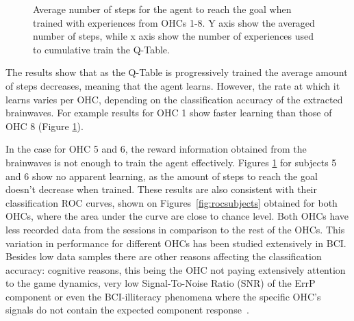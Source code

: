 \documentclass[journal]{IEEEtran}
\begin{document}
{{\begin{figure}[h!]
\begin{subfigure}{0.5\textwidth}
\end{subfigure}
\caption{Average number of steps for the agent to reach the goal when trained with experiences from OHCs 1-8. Y axis show the averaged number of steps, while x axis show the number of experiences used to cumulative train the Q-Table.}
\label{fig:avg_steps}
\end{figure}


The results show that as the Q-Table is progressively trained the average amount of steps decreases, meaning that the agent learns. However, the rate at which it learns varies per OHC, depending on the classification accuracy of the extracted brainwaves.  For example results for OHC 1 show faster learning than those of OHC 8 (Figure \ref{fig:avg_steps}).

In the case for OHC 5 and 6, the reward information obtained from the brainwaves is not enough to train the agent effectively. Figures \ref{fig:avg_steps} for subjects 5 and 6 show no apparent learning, as the amount of steps to reach the goal doesn't decrease when trained.  These results are also consistent with their classification ROC curves, shown on Figures~\ref{fig:rocsubjects} obtained for both OHCs, where the area under the curve are close to chance level.  Both OHCs have less recorded data from the sessions in comparison to the rest of the OHCs.   This variation in performance for different OHCs has been studied extensively in BCI.  Besides low data samples there are other reasons affecting the classification accuracy:  cognitive reasons, this being the OHC not paying extensively attention to the game dynamics, very low Signal-To-Noise Ratio (SNR) of the ErrP component or even the BCI-illiteracy phenomena where the specific OHC's signals do not contain the expected component response~\cite{Yousefi2019}.

}}
\end{document}
